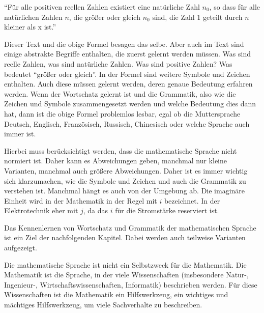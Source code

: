 \enquote{Für alle positiven reellen Zahlen existiert eine natürliche Zahl 
$n_0$, so dass für alle natürlichen Zahlen $n$, die größer oder gleich $n_0$ 
sind, die Zahl 1 geteilt durch $n$ kleiner als x ist.}

Dieser Text und die obige Formel besagen das selbe. Aber auch im Text sind 
einige abstrakte Begriffe enthalten, die zuerst gelernt werden müssen. Was 
sind reelle Zahlen, was sind natürliche Zahlen. Was sind positive Zahlen? Was
bedeutet \enquote{größer oder gleich}. In der Formel sind weitere Symbole und
Zeichen enthalten. Auch diese müssen gelernt werden, deren genaue Bedeutung 
erfahren werden. Wenn der Wortschatz gelernt ist und die Grammatik, also wie 
die Zeichen und Symbole zusammengesetzt werden und welche Bedeutung dies dann 
hat, dann ist die obige Formel problemlos lesbar, egal ob die 
Muttersprache Deutsch, Englisch, Französisch, Russisch, Chinesisch oder 
welche Sprache auch immer ist.

Hierbei muss berücksichtigt werden, dass die mathematische Sprache nicht 
normiert ist. Daher kann es Abweichungen geben, manchmal nur kleine Varianten,
manchmal auch größere Abweichungen. Daher ist es immer wichtig sich 
klarzumachen, wie die Symbole und Zeichen und auch die Grammatik zu verstehen 
ist. Manchmal hängt es auch von der Umgebung ab. Die imaginäre Einheit wird in 
der Mathematik in der Regel mit $i$ bezeichnet. In der Elektrotechnik eher mit 
$j$, da das $i$ für die Stromstärke reserviert ist.

Das Kennenlernen von Wortschatz und Grammatik der mathematischen Sprache ist 
ein Ziel der nachfolgenden Kapitel. Dabei werden auch teilweise Varianten
aufgezeigt. 

Die mathematische Sprache ist nicht ein Selbstzweck für die Mathematik. Die
Mathematik ist die Sprache, in der viele Wissenschaften (insbesondere Natur-,
Ingenieur-, Wirtschaftswissenschaften, Informatik) beschrieben werden. Für 
diese Wissenschaften ist die Mathematik ein Hilfswerkzeug, ein wichtiges und
mächtiges Hilfswerkzeug, um viele Sachverhalte zu beschreiben.
